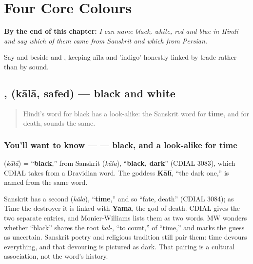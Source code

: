 
\chapter{Four Core Colours}
\label{ch:hi-core-colours}

\begin{chapteropening}
\textbf{By the end of this chapter:} \emph{I can name black, white, red and blue in Hindi and say which of them came from Sanskrit and which from Persian.}

Say  and  beside  and , keeping nīla and 'indigo' honestly linked by trade rather than by sound.
\end{chapteropening}

\section[\texorpdfstring{\hi{काला} \hi{सफ़ेद} (kālā safed)}{काला सफ़ेद (kālā safed)}]{,  (kālā, safed) — black and white}

\label{lesson:HI-C11-kaalaa-safed}



\begin{quote}
Hindi's word for black has a look-alike: the Sanskrit word for \textbf{time}, and for death, sounds the same.
\end{quote}

\subsection*{You'll want to know —  — black, and a look-alike for time}
\textbf{} (\emph{kālā}) = \textquotedblleft{}\textbf{black},\textquotedblright{} from Sanskrit \textbf{} (\emph{kāla}), \textquotedblleft{}\textbf{black, dark}\textquotedblright{} (CDIAL 3083), which CDIAL takes from a Dravidian word. The goddess \textbf{Kālī}, \textquotedblleft{}the dark one,\textquotedblright{} is named from the same word.

Sanskrit has a second \textbf{} (\emph{kāla}), \textquotedblleft{}\textbf{time},\textquotedblright{} and so \textquotedblleft{}fate, death\textquotedblright{} (CDIAL 3084); as Time the destroyer it is linked with \textbf{Yama}, the god of death. CDIAL gives the two separate entries, and Monier-Williams lists them as two words. MW wonders whether \textquotedblleft{}black\textquotedblright{} shares the root \emph{kal-}, \textquotedblleft{}to count,\textquotedblright{} of \textquotedblleft{}time,\textquotedblright{} and marks the guess as uncertain. Sanskrit poetry and religious tradition still pair them: time devours everything, and that devouring is pictured as dark. That pairing is a cultural association, not the word's history.

